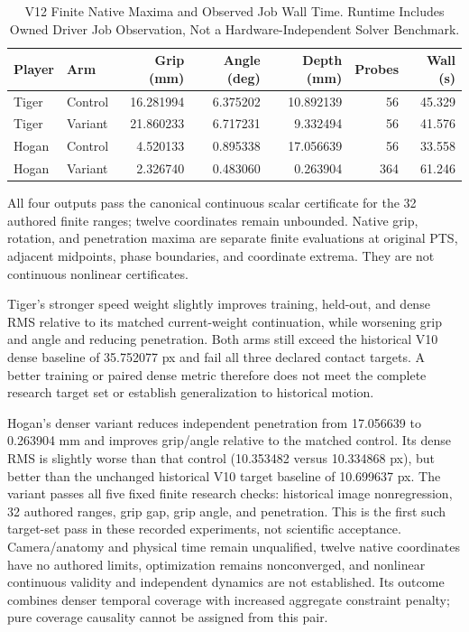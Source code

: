 \documentclass[11pt,letterpaper]{article}
\begin{document}
\begin{table}[ht]\centering\small
\begin{tabular}{@{}llrrrrr@{}}
\toprule Player & Arm & Grip (mm) & Angle (deg) & Depth (mm) & Probes & Wall (s)\\\midrule
Tiger & Control & 16.281994 & 6.375202 & 10.892139 & 56 & 45.329\\
Tiger & Variant & 21.860233 & 6.717231 & 9.332494 & 56 & 41.576\\
Hogan & Control & 4.520133 & 0.895338 & 17.056639 & 56 & 33.558\\
Hogan & Variant & 2.326740 & 0.483060 & 0.263904 & 364 & 61.246\\
\bottomrule
\end{tabular}
\caption{V12 Finite Native Maxima and Observed Job Wall Time. Runtime Includes
Owned Driver Job Observation, Not a Hardware-Independent Solver Benchmark.}
\end{table}
All four outputs pass the canonical continuous scalar certificate for the
32 authored finite ranges; twelve coordinates remain unbounded. Native grip,
rotation, and penetration maxima are separate finite evaluations at original
PTS, adjacent midpoints, phase boundaries, and coordinate extrema. They are
not continuous nonlinear certificates.

Tiger's stronger speed weight slightly improves training, held-out, and dense
RMS relative to its matched current-weight continuation, while worsening grip
and angle and reducing penetration. Both arms still exceed the historical
V10 dense baseline of 35.752077 px and fail all three declared contact targets.
A better training or paired dense metric therefore does not meet the complete
research target set or establish generalization to historical motion.

Hogan's denser variant reduces independent penetration from 17.056639 to
0.263904 mm and improves grip/angle relative to the matched control. Its dense
RMS is slightly worse than that control (10.353482 versus 10.334868 px), but
better than the unchanged historical V10 target baseline of 10.699637 px.
The variant passes all five fixed finite research checks: historical image
nonregression, 32 authored ranges, grip gap, grip angle, and penetration. This
is the first such target-set pass in these recorded experiments, not scientific
acceptance. Camera/anatomy and physical time remain unqualified, twelve native
coordinates have no authored limits, optimization remains nonconverged, and
nonlinear continuous validity and independent dynamics are not established.
Its outcome combines denser temporal coverage with increased aggregate
constraint penalty; pure coverage causality cannot be assigned from this pair.
\end{document}
